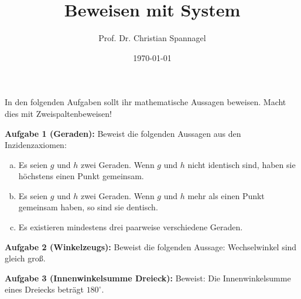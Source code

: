 \documentclass{../cssheet}
\title{Beweisen mit System}
\author{Prof. Dr. Christian Spannagel}
\date{\today}
\begin{document}
\printtitle

In den folgenden Aufgaben sollt ihr mathematische Aussagen beweisen. Macht dies mit Zweispaltenbeweisen!

\textbf{Aufgabe 1 (Geraden):}  Beweist die folgenden Aussagen aus den Inzidenzaxiomen:
\begin{enumerate}[a)]
\item Es seien $g$ und $h$ zwei Geraden. Wenn $g$ und $h$ nicht identisch sind, haben sie höchstens einen Punkt gemeinsam.
\item Es seien $g$ und $h$ zwei Geraden. Wenn $g$ und $h$ mehr als einen Punkt gemeinsam haben, so sind sie dentisch.
\item Es existieren mindestens drei paarweise verschiedene Geraden.
\end{enumerate}

\textbf{Aufgabe 2 (Winkelzeugs):}  Beweist die folgenden Aussage: Wechselwinkel sind gleich groß.

\textbf{Aufgabe 3 (Innenwinkelsumme Dreieck):}  Beweist: Die Innenwinkelsumme eines Dreiecks beträgt $180^\circ$.


\newpage
\printlicense

\printsocials

\end{document}
